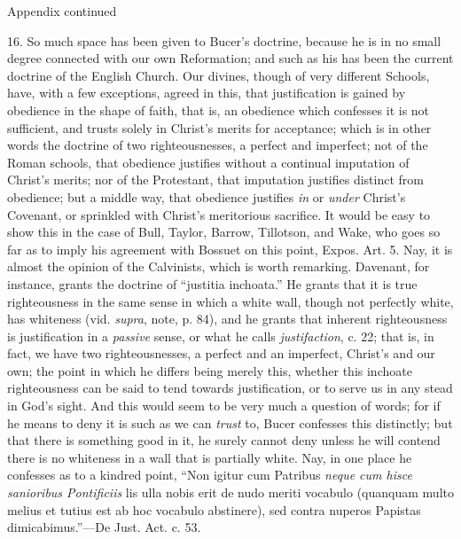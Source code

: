 Appendix continued


16. So much space has been given to Bucer's doctrine, because he is
in no small degree connected with our own Reformation; and such
as his has been the current doctrine of the English Church. Our
divines, though of very different Schools, have, with a few
exceptions, agreed in this, that justification is gained by obedience
in the shape of faith, that is, an obedience which confesses it is not
sufficient, and trusts solely in Christ's merits for acceptance; which
is in other words the doctrine of two righteousnesses, a perfect and
imperfect; not of the Roman schools, that obedience justifies without
a continual imputation of Christ's merits; nor of the Protestant, that
imputation justifies distinct from obedience; but a middle way, that
obedience justifies \emph{in} or \emph{under} Christ's Covenant, or
sprinkled with Christ's meritorious sacrifice. It would be easy to
show this in the case of Bull, Taylor, Barrow, Tillotson, and Wake,
who goes so far as to imply his agreement with Bossuet on this point,
Expos. Art. 5. Nay, it is almost the opinion of the Calvinists, which
is worth remarking. Davenant, for instance, grants the doctrine of
``justitia inchoata.'' He grants that it is true righteousness
in the same sense in which a white wall, though not perfectly white,
has whiteness (vid. \emph{supra}, note, p. 84), and he grants that
inherent righteousness is justification in a \emph{passive} sense, or
what he calls \emph{justifaction}, c. 22; that is, in fact, we have
two righteousnesses, a perfect and an imperfect, Christ's and our own;
the point in which he differs being merely this, whether this inchoate
righteousness can be said to tend towards justification, or to serve
us in any stead in God's sight. And this would seem to be very much a
question of words; for if he means to deny it is such as we can \emph{trust}
to, Bucer confesses this distinctly; but that there is something good
in it, he surely cannot deny unless he will contend there is no
whiteness in a wall that is partially white. Nay, in one place he
confesses as to a kindred point, ``Non igitur cum Patribus \emph{neque
cum hisce sanioribus Pontificiis} lis ulla nobis erit de nudo
meriti vocabulo (quanquam multo melius et tutius est ab hoc vocabulo
abstinere), sed contra nuperos Papistas dimicabimus.''—De
Just. Act. c. 53.

